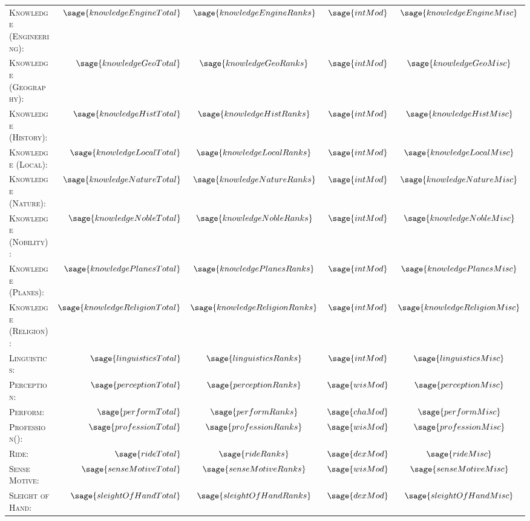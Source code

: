 \documentclass[10pt]{article}
\begin{document}
\begin{tabular}{l r c c c}
		\textsc{Knowledge (Engineering):} & \(\sage{knowledgeEngineTotal}\) & \(\sage{knowledgeEngineRanks}\) & \(\sage{intMod}\) & \(\sage{knowledgeEngineMisc}\)\\
		\textsc{Knowledge (Geography):} & \(\sage{knowledgeGeoTotal}\) & \(\sage{knowledgeGeoRanks}\) & \(\sage{intMod}\) & \(\sage{knowledgeGeoMisc}\)\\
		\textsc{Knowledge (History):} & \(\sage{knowledgeHistTotal}\) & \(\sage{knowledgeHistRanks}\) & \(\sage{intMod}\) & \(\sage{knowledgeHistMisc}\)\\
		\textsc{Knowledge (Local):} & \(\sage{knowledgeLocalTotal}\) & \(\sage{knowledgeLocalRanks}\) & \(\sage{intMod}\) & \(\sage{knowledgeLocalMisc}\)\\
		\textsc{Knowledge (Nature):} & \(\sage{knowledgeNatureTotal}\) & \(\sage{knowledgeNatureRanks}\) & \(\sage{intMod}\) & \(\sage{knowledgeNatureMisc}\)\\
		\textsc{Knowledge (Nobility):} & \(\sage{knowledgeNobleTotal}\) & \(\sage{knowledgeNobleRanks}\) & \(\sage{intMod}\) & \(\sage{knowledgeNobleMisc}\)\\
		\textsc{Knowledge (Planes):} & \(\sage{knowledgePlanesTotal}\) & \(\sage{knowledgePlanesRanks}\) & \(\sage{intMod}\) & \(\sage{knowledgePlanesMisc}\)\\
		\textsc{Knowledge (Religion):} & \(\sage{knowledgeReligionTotal}\) & \(\sage{knowledgeReligionRanks}\) & \(\sage{intMod}\) & \(\sage{knowledgeReligionMisc}\)\\
		\textsc{Linguistics:} & \(\sage{linguisticsTotal}\) & \(\sage{linguisticsRanks}\) & \(\sage{intMod}\) & \(\sage{linguisticsMisc}\) \\
		\textsc{Perception:} & \(\sage{perceptionTotal}\) & \(\sage{perceptionRanks}\) & \(\sage{wisMod}\) & \(\sage{perceptionMisc}\) \\
		\textsc{Perform:} & \(\sage{performTotal}\) & \(\sage{performRanks}\) & \(\sage{chaMod}\) & \(\sage{performMisc}\) \\
		\textsc{Profession():} & \(\sage{professionTotal}\) & \(\sage{professionRanks}\) & \(\sage{wisMod}\) & \(\sage{professionMisc}\) \\
		\textsc{Ride:} & \(\sage{rideTotal}\) & \(\sage{rideRanks}\) & \(\sage{dexMod}\) & \(\sage{rideMisc}\) \\
		\textsc{Sense Motive:} & \(\sage{senseMotiveTotal}\) & \(\sage{senseMotiveRanks}\) & \(\sage{wisMod}\) & \(\sage{senseMotiveMisc}\) \\
		\textsc{Sleight of Hand:} & \(\sage{sleightOfHandTotal}\) & \(\sage{sleightOfHandRanks}\) & \(\sage{dexMod}\) & \(\sage{sleightOfHandMisc}\) \\

\end{tabular}
\end{document}
